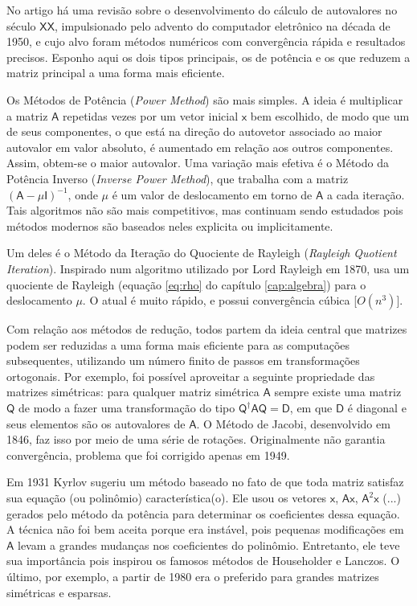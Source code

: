 	No artigo \cite{autovaloresSecXX} há uma revisão sobre o desenvolvimento do cálculo de autovalores no século $\mathsf{XX}$, impulsionado pelo advento do computador eletrônico na década de 1950, e cujo alvo foram métodos numéricos com convergência rápida e resultados precisos. Esponho aqui os dois tipos principais, os de potência e os que reduzem a matriz principal a uma forma mais eficiente.
	
	Os Métodos de Potência (\emph{Power Method}) são mais simples. A ideia é multiplicar a matriz $\mathsf{A}$ repetidas vezes por um vetor inicial $\mathsf{x}$ bem escolhido, de modo que um de seus componentes, o que está na direção do autovetor associado ao maior autovalor em valor absoluto, é aumentado em relação aos outros componentes. Assim, obtem-se o maior autovalor. Uma variação mais efetiva é o Método da Potência Inverso (\emph{Inverse Power Method}), que trabalha com a matriz $(\mathsf{A} - \mu \mathsf{I})^{-1}$, onde $\mu$ é um valor de deslocamento em torno de $\mathsf{A}$ a cada iteração. Tais algoritmos não são mais competitivos, mas continuam sendo estudados pois métodos modernos são baseados neles explicita ou implicitamente.
	
	Um deles é o Método da Iteração do Quociente de Rayleigh (\emph{Rayleigh Quotient Iteration}). Inspirado num algoritmo utilizado por Lord Rayleigh em 1870, usa um quociente de Rayleigh (equação \ref{eq:rho} do capítulo \ref{cap:algebra}) para o deslocamento $\mu$. O atual é muito rápido, e possui convergência cúbica [$O(n^3)$].
		
	Com relação aos métodos de redução, todos partem da ideia central que matrizes podem ser reduzidas a uma forma mais eficiente para as computações subsequentes, utilizando um número finito de passos em transformações ortogonais. Por exemplo, foi possível aproveitar a seguinte propriedade das matrizes simétricas: para qualquer matriz simétrica $\mathsf{A}$ sempre existe uma matriz $\mathsf{Q}$ de modo a fazer uma transformação do tipo $\mathsf{Q}^{\dag} \mathsf{A} \mathsf{Q} = \mathsf{D}$, em que $\mathsf{D}$ é diagonal e seus elementos são os autovalores de $\mathsf{A}$. O Método de Jacobi, desenvolvido em 1846, faz isso por meio de uma série de rotações. Originalmente não garantia convergência, problema que foi corrigido apenas em 1949.
	
	Em 1931 Kyrlov sugeriu um método baseado no fato de que toda matriz satisfaz sua equação (ou polinômio) característica(o). Ele usou os vetores $\mathsf{x}$, $\mathsf{A}\mathsf{x}$, $\mathsf{A}^2\mathsf{x}$ (...) gerados pelo método da potência para determinar os coeficientes dessa equação. A técnica não foi bem aceita porque era instável, pois pequenas modificações em $\mathsf{A}$ levam a grandes mudanças nos coeficientes do polinômio. Entretanto, ele teve sua importância pois inspirou os famosos métodos de Householder e Lanczos. O último, por exemplo, a partir de 1980 era o preferido para grandes matrizes simétricas e esparsas.
	
